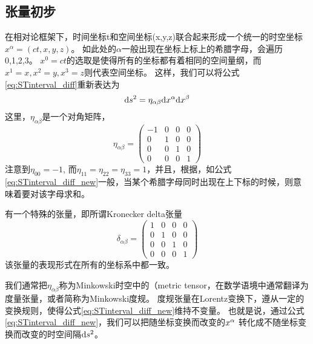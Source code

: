 \subsection{张量初步}
在相对论框架下，时间坐标t和空间坐标(x,y,z)联合起来形成一个统一的时空坐标
$x^{\alpha} = (ct,x,y,z)$。
如此处的$\alpha$一般出现在坐标上标上的希腊字母，会遍历{0,1,2,3}。
$x^0= ct$的选取是使得所有的坐标都有着相同的空间量纲，而$x^1 =x, x^2 = y, x^3 = z$则代表空间坐标。
这样，我们可以将公式\ref{eq:STinterval_diff}重新表达为
\begin{equation}\label{eq:STinterval_diff_new}
  {\rm d}s^2 = \eta_ {\alpha \beta}{\rm d}x^\alpha {\rm d} x^\beta
\end{equation}
这里，$\eta_ {\alpha \beta}$是一个对角矩阵，
\begin{equation}\label{eq:Minkowski}
  \eta_{\alpha\beta} ={\begin{pmatrix}
                       -1 & 0 & 0 & 0\\
                        0 & 1 & 0 & 0\\ 
                        0 & 0 & 1 & 0\\
                        0 & 0 & 0 & 1\end{pmatrix}}
\end{equation}
注意到$\eta_{00} = -1$, 而$\eta_{11} = \eta_{22} = \eta_{33} = 1$，并且，根据{}，如公式\ref{eq:STinterval_diff_new}一般，当某个希腊字母同时出现在上下标的时候，则意味着要对该字母求和。


\begin{myprop}{}{}
  有一个特殊的张量，即所谓Kronecker delta张量
\begin{equation}\label{eq:Kronecker}
  \delta_{\alpha\beta} ={\begin{pmatrix}
                        1 & 0 & 0 & 0\\
                        0 & 1 & 0 & 0\\ 
                        0 & 0 & 1 & 0\\
                        0 & 0 & 0 & 1\end{pmatrix}}
\end{equation}
  该张量的表现形式在所有的坐标系中都一致。
\end{myprop}

我们通常把$\eta_ {\alpha \beta}$称为Minkowski时空中的{}（metric tensor，在数学语境中通常翻译为度量张量，或者简称为Minkowski度规。
度规张量在Lorentz变换下，遵从一定的变换规则，使得公式\ref{eq:STinterval_diff_new}维持不变量。
也就是说，通过公式\ref{eq:STinterval_diff_new}，我们可以把随坐标变换而改变的${\rm }x^{\alpha} $ 转化成不随坐标变换而改变的时空间隔${\rm d} s^2$。

